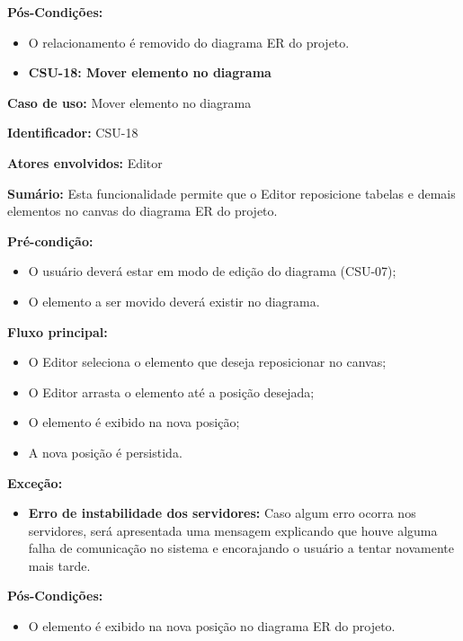 \textbf{Pós-Condições:}
\begin{itemize}
    \item O relacionamento é removido do diagrama ER do projeto.
\end{itemize}

\vspace{1em}

\begin{itemize}
    \item \textbf{CSU-18: Mover elemento no diagrama}
\end{itemize}

\textbf{Caso de uso:} Mover elemento no diagrama

\textbf{Identificador:} CSU-18

\textbf{Atores envolvidos:} Editor

\textbf{Sumário:} Esta funcionalidade permite que o Editor reposicione tabelas e demais elementos no canvas do diagrama ER do projeto.

\textbf{Pré-condição:}
\begin{itemize}
    \item O usuário deverá estar em modo de edição do diagrama (CSU-07);
    \item O elemento a ser movido deverá existir no diagrama.
\end{itemize}

\textbf{Fluxo principal:}
\begin{itemize}
    \item O Editor seleciona o elemento que deseja reposicionar no canvas;
    \item O Editor arrasta o elemento até a posição desejada;
    \item O elemento é exibido na nova posição;
    \item A nova posição é persistida.
\end{itemize}

\textbf{Exceção:}
\begin{itemize}
    \item \textbf{Erro de instabilidade dos servidores:} Caso algum erro ocorra nos servidores, será apresentada uma mensagem explicando que houve alguma falha de comunicação no sistema e encorajando o usuário a tentar novamente mais tarde.
\end{itemize}

\textbf{Pós-Condições:}
\begin{itemize}
    \item O elemento é exibido na nova posição no diagrama ER do projeto.
\end{itemize}

